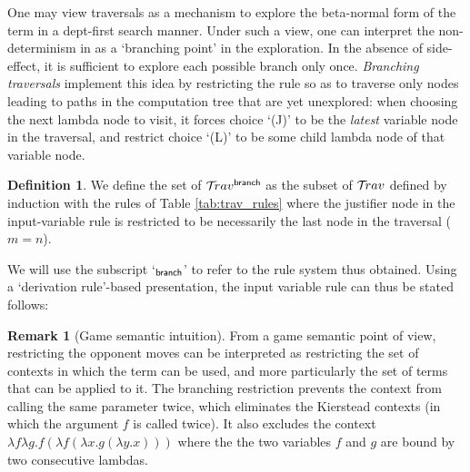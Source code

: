 \documentclass{article}
\theoremstyle{definition}
\newtheorem{definition}{Definition}[section]
\newtheorem{remark}{Remark}[section]
\newcommand\Nodes{N}%
\newcommand\NodesVar{N_{\sf var}}%
\newcommand{\branching}{{\sf branch}}
\newcommand{\travsetbr}{{\travset^\branching}}
\newcommand{\travulc}{\travset}
\newcommand{\rulefont}[1]{\mathbf{\sf #1}}
\newcommand{\enables}{\vdash} %
\newcommand{\NodeHjByRoot}{\Nodes^{\enables^*}} %
\begin{document}
One may view traversals as a mechanism to explore the beta-normal form of the term in a dept-first search manner. Under such a view, one can interpret the non-determinism in  as a `branching point' in the exploration. In the absence of side-effect, it is sufficient to explore each possible branch only once. \emph{Branching traversals} implement this idea by restricting the rule  so as to traverse only nodes leading to paths in the computation tree that are yet unexplored: when choosing the next lambda node to visit, it forces choice `(J)' to be the \emph{latest} variable node in the traversal, and restrict choice `(L)' to be some child lambda node of that variable node.

\begin{definition}
\label{dfn:branching_traversals}
We define the set of  $\travsetbr$ as the subset of $\travulc$ defined by induction with the rules of Table \ref{tab:trav_rules} where the justifier node in the
input-variable rule  is restricted to be necessarily the last node in the traversal ($m=n$).

We will use the subscript `${}_\branching$' to refer to the rule system thus obtained. Using a `derivation rule'-based presentation, the input variable rule can thus be stated follows:
\infrule[$\rulefont{IVar}_\branching$]
     {t \cdot n \in \travsetbr
      \andalso n \in\NodeHjByRoot \inter \NodesVar
      \andalso n \enables_i \alpha
      \andalso i \geq 1
     }
     { \in \travsetbr}
\end{definition}

\begin{remark}[Game semantic intuition]
From a game semantic point of view, restricting the opponent moves can be interpreted as restricting the set of contexts in which the term can be used, and more particularly the set of terms that can be applied to it.
The branching restriction prevents the context from calling the same parameter twice, which eliminates the Kierstead contexts (in which the argument $f$ is called twice). It also excludes the context $\lambda f \lambda g . f (\lambda f (\lambda x . g (\lambda y . x)))$ where the the two variables $f$ and $g$ are bound by two consecutive lambdas.
\end{remark}
\end{document}
